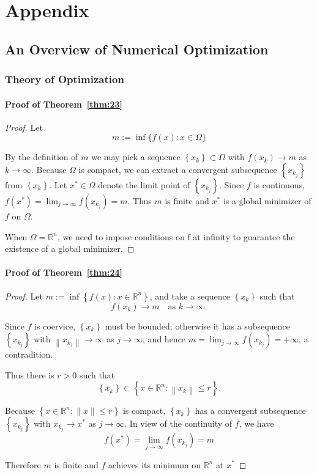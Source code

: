 \chapter{Appendix}
\renewcommand{\thesection}{\Alph{section}}
\label{appendix}
\section{An Overview of Numerical Optimization}
\subsection{Theory of Optimization}

\subsubsection{Proof of Theorem~\ref{thm:23}}
\label{appendix:trm23}
\begin{proof}
Let 
$$
m:=\inf \{f(x): x \in \Omega\}
$$
\par By the definition of $m$ we may pick a sequence $\left\{x_{k}\right\} \subset \Omega$ with $f\left(x_{k}\right) \rightarrow m$ as $k \rightarrow \infty$. Because $\Omega$ is compact, we can extract a convergent subsequence $\left\{x_{k_j}\right\}$ from $\left\{x_{k}\right\}$. Let $x^{*} \in \Omega$ denote the limit point of $\left\{x_{k_j}\right\}$. Since $f$ is continuous, $f\left(x^{*}\right)=\lim _{j \rightarrow \infty} f\left(x_{k_{j}}\right)=m$. Thus $m$ is finite and $x^{*}$ is a global minimizer of $f$ on $\Omega$. 
\par When $\Omega = \mathbb{R}^n$, we need to impose conditions on f at infinity to guarantee the existence of a global minimizer.
\end{proof}

\subsubsection{Proof of Theorem~\ref{thm:24}}
\label{appendix:trm24}
\begin{proof}
Let $m:=\inf \left\{f(x): x \in \mathbb{R}^{n}\right\}$, and take a sequence $\left\{x_{k}\right\}$ such that 
$$
f\left(x_{k}\right) \rightarrow m \quad \textrm{as }  k \rightarrow \infty .
$$
\par Since $f$ is coervice, $\left\{x_{k}\right\}$ must be bounded; otherwise it has a subsequence $\left\{x_{k_j}\right\}$ with $\left\|x_{k_{j}}\right\| \rightarrow \infty$ as $j \rightarrow \infty$, and hence $m=\lim _{j \rightarrow \infty} f\left(x_{k_{j}}\right)=+\infty$, a contradition. 
\par Thus there is $r > 0$ such that
$$
\left\{x_{k}\right\} \subset\left\{x \in \mathbb{R}^{n}:\left\|x_{k}\right\| \leq r\right\}.
$$
\par Because $\left\{x \in \mathbb{R}^{n}:\|x\| \leq r\right\}$ is compact, $\left\{x_{k}\right\}$ has a convergent subsequence $\left\{x_{k_j}\right\}$ with $x_{k_{j}} \rightarrow x^{*}$ as $j \rightarrow \infty$. In view of the continuity of $f$, we have 
$$
f\left(x^{*}\right)=\lim _{j \rightarrow \infty} f\left(x_{k_{j}}\right)=m
$$
\par Therefore $m$ is finite and $f$ achieves its minimum on $\mathbb{R}^n$ at $x^{*}$
\end{proof}
